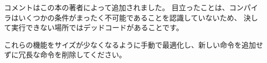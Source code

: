 




コメントはこの本の著者によって追加されました。 
目立ったことは、コンパイラはいくつかの条件がまったく不可能であることを認識していないため、
決して実行できない場所ではデッドコードがあることです。

\mysubparagraph{\Exercise}

これらの機能をサイズが少なくなるように手動で最適化し、新しい命令を追加せずに冗長な命令を削除してください。
